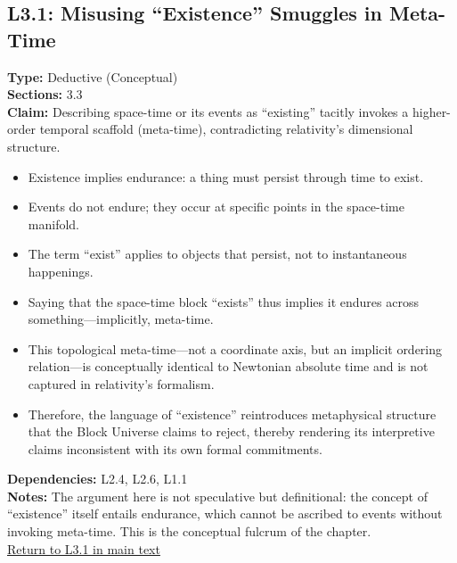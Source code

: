 \documentclass[12pt]{book}
\newcommand{\returnlink}[1]{\hyperref[logic:#1]{Return to #1 in main text}\xspace}
\begin{document}
\subsection*{L3.1: Misusing ``Existence'' Smuggles in Meta-Time}\label{appendix:L3.1}
\textbf{Type:} Deductive (Conceptual) \\
\textbf{Sections:} 3.3 \\
\textbf{Claim:} Describing space-time or its events as ``existing'' tacitly invokes a higher-order temporal scaffold (meta-time), contradicting relativity's dimensional structure.
\begin{itemize}
  \item Existence implies endurance: a thing must persist through time to exist. 
  \item Events do not endure; they occur at specific points in the space-time manifold.
  \item The term ``exist'' applies to objects that persist, not to instantaneous happenings.
  \item Saying that the space-time block ``exists'' thus implies it endures across something---implicitly, meta-time.
  \item This topological meta-time---not a coordinate axis, but an implicit ordering relation---is conceptually identical to Newtonian absolute time and is not captured in relativity's formalism.
  \item Therefore, the language of ``existence'' reintroduces metaphysical structure that the Block Universe claims to reject, thereby rendering its interpretive claims inconsistent with its own formal commitments.
\end{itemize}
\textbf{Dependencies:} L2.4, L2.6, L1.1 \\
\textbf{Notes:} The argument here is not speculative but definitional: the concept of ``existence'' itself entails endurance, which cannot be ascribed to events without invoking meta-time. This is the conceptual fulcrum of the chapter.\\
\returnlink{L3.1}
\end{document}

